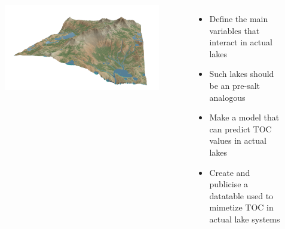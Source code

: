 \documentclass[aspectratio=169]{beamer} %
\begin{document}
{

{ \begin{frame}
	\vspace{1cm}
	\begin{center}
	\begin{large}
	\color{blue}{Objectives}
	\end{large}
	\end{center}
\begin{flushright}
    \begin{columns}

        \centering
	     	\begin{figure}
		\centering
		\includegraphics[scale=0.3]{images/HL.png}
	\end{figure}
        \centering
         \begin{itemize}
          \item Define the main variables that interact in actual lakes   
          \pause
           \item Such lakes should be an pre-salt analogous
           \pause
          \item Make a model that can predict TOC values in actual lakes
           \pause
           \item Create and publicise a datatable used to mimetize TOC in actual lake systems
     

\end{itemize}
\end{columns}
\end{flushright}
\end{frame}}}
\end{document}
